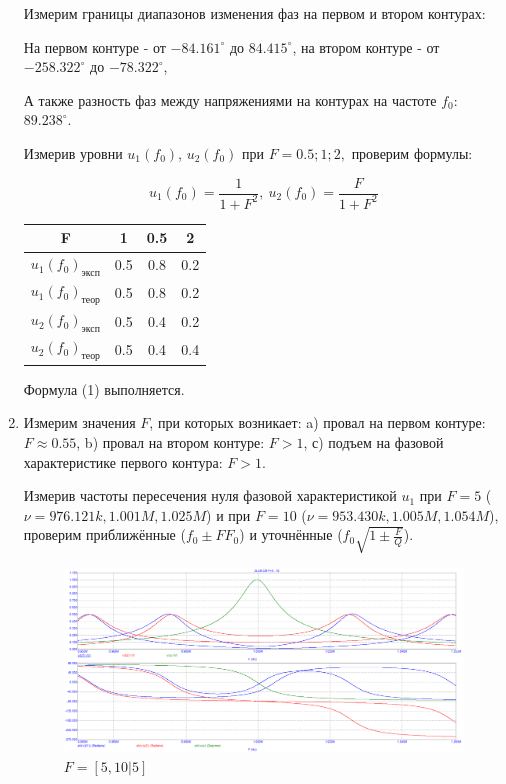 \documentclass[a4paper, 12pt]{article}%
\begin{document}
\begin{enumerate}
Измерим границы диапазонов изменения фаз на первом и втором контурах:

На первом контуре - от  $-84.161^{\circ}$ до $84.415^{\circ}$, на втором контуре - от $-258.322^{\circ}$ до $-78.322^{\circ}$,

А также разность фаз между напряжениями на контурах на частоте $f_0:$ $89.238^{\circ}$.

Измерив уровни $u_1(f_0)$, $u_2(f_0)$ при $F = 0.5; 1; 2,$ проверим формулы:

\begin{equation}
u_1(f_0) = \frac{1}{1 + F^2}, \: u_2(f_0) = \frac{F}{1 + F^2}
\end{equation}

\begin{center}
\begin{tabular}{|c|c|c|c|}
\hline 
F & 1 & 0.5 & 2 \\ 
\hline 
$u_1(f_0)_{\text{эксп}}$ & 0.5 & 0.8 & 0.2 \\ 
\hline 
$u_1(f_0)_{\text{теор}}$ & 0.5 & 0.8 & 0.2 \\ 
\hline 
$u_2(f_0)_{\text{эксп}}$ & 0.5 & 0.4 & 0.2 \\ 
\hline 
$u_2(f_0)_{\text{теор}}$ & 0.5 & 0.4 & 0.4 \\ 
\hline 
\end{tabular}
\end{center}

Формула (1) выполняется.

\newpage

\item Измерим значения $F$, при которых возникает: a) провал на первом контуре: $F \approx 0.55$, b) провал на втором контуре: $F > 1$, с) подъем на фазовой характеристике первого контура: $F > 1$.

Измерив частоты пересечения нуля фазовой характеристикой $u_1$ при $F = 5$ ($\nu = 976.121k, 1.001M, 1.025M$) и при $F = 10$ ($\nu = 953.430k, 1.005M, 1.054M$), проверим приближённые ($f_0 \pm FF_0$) и уточнённые ($f_0\sqrt{1 \pm \frac{F}{Q}}$).

\begin{figure}[h!]
\centering
\includegraphics[scale = 0.4]{images/plot4_1.png}
\caption{$F = [5, 10 | 5]$}
\label{fig:Image1}
\end{figure}


\end{enumerate}
\end{document}
